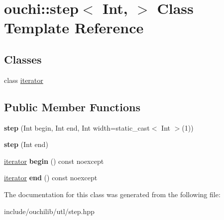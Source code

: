 \hypertarget{classouchi_1_1step}{}\section{ouchi\+::step$<$ Int, $>$ Class Template Reference}
\label{classouchi_1_1step}
\subsection*{Classes}
\begin{DoxyCompactItemize}
\item 
class \mbox{\hyperlink{classouchi_1_1step_1_1iterator}{iterator}}
\end{DoxyCompactItemize}
\subsection*{Public Member Functions}
\begin{DoxyCompactItemize}
\item 
\mbox{\label{classouchi_1_1step_a6785941ce2db91113bcab11bf682c322}} 
{\bfseries step} (Int begin, Int end, Int width=static\+\_\+cast$<$ Int $>$(1))
\item 
\mbox{\label{classouchi_1_1step_a263845dd2616f8b944eb548b7cd47f6c}} 
{\bfseries step} (Int end)
\item 
\mbox{\label{classouchi_1_1step_ab7afe6305d3469e6ac44a2e6cbbd50c3}} 
\mbox{\hyperlink{classouchi_1_1step_1_1iterator}{iterator}} {\bfseries begin} () const noexcept
\item 
\mbox{\label{classouchi_1_1step_aeea828ba1e0f60af43d17b227e409ebe}} 
\mbox{\hyperlink{classouchi_1_1step_1_1iterator}{iterator}} {\bfseries end} () const noexcept
\end{DoxyCompactItemize}


The documentation for this class was generated from the following file\+:\begin{DoxyCompactItemize}
\item 
include/ouchilib/utl/step.\+hpp\end{DoxyCompactItemize}
